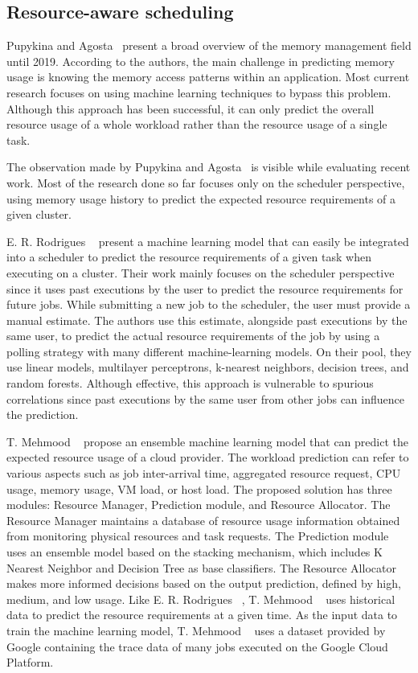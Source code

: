 \subsection{Resource-aware scheduling}
\label{subsec:resource-aware-scheduling}

Pupykina and Agosta~\cite{pupykina2019} present a broad overview of the memory management field until 2019.
According to the authors, the main challenge in predicting memory usage is knowing the memory access patterns within an application.
Most current research focuses on using machine learning techniques to bypass this problem.
Although this approach has been successful, it can only predict the overall resource usage of a whole workload rather than the resource usage of a single task.

The observation made by Pupykina and Agosta~\cite{pupykina2019} is visible while evaluating recent work.
Most of the research done so far focuses only on the scheduler perspective, using memory usage history to predict the expected resource requirements of a given cluster.

E. R. Rodrigues \etal~\cite{rodrigues2016} present a machine learning model that can easily be integrated into a scheduler to predict the resource requirements of a given task when executing on a cluster.
Their work mainly focuses on the scheduler perspective since it uses past executions by the user to predict the resource requirements for future jobs.
While submitting a new job to the scheduler, the user must provide a manual estimate.
The authors use this estimate, alongside past executions by the same user, to predict the actual resource requirements of the job by using a polling strategy with many different machine-learning models.
On their pool, they use linear models, multilayer perceptrons, k-nearest neighbors, decision trees, and random forests.
Although effective, this approach is vulnerable to spurious correlations since past executions by the same user from other jobs can influence the prediction.

T. Mehmood \etal~\cite{mehmood2018} propose an ensemble machine learning model that can predict the expected resource usage of a cloud provider.
The workload prediction can refer to various aspects such as job inter-arrival time, aggregated resource request, CPU usage, memory usage, VM load, or host load. 
The proposed solution has three modules: Resource Manager, Prediction module, and Resource Allocator.
The Resource Manager maintains a database of resource usage information obtained from monitoring physical resources and task requests.
The Prediction module uses an ensemble model based on the stacking mechanism, which includes K Nearest Neighbor and Decision Tree as base classifiers.
The Resource Allocator makes more informed decisions based on the output prediction, defined by high, medium, and low usage.
Like E. R. Rodrigues \etal~\cite{rodrigues2016}, T. Mehmood \etal~\cite{mehmood2018} uses historical data to predict the resource requirements at a given time.
As the input data to train the machine learning model, T. Mehmood \etal~\cite{mehmood2018} uses a dataset provided by Google containing the trace data of many jobs executed on the Google Cloud Platform.

